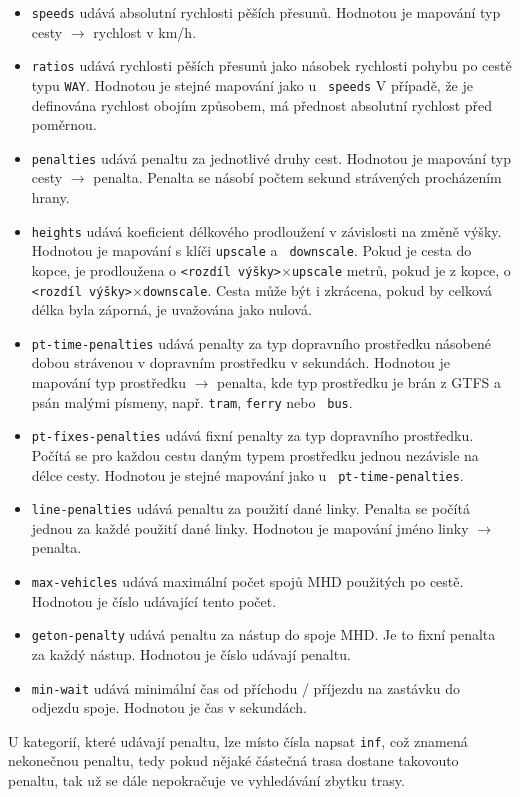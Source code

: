 \begin{itemize}
	\item {\tt speeds} udává absolutní rychlosti pěších přesunů. Hodnotou je mapování
	typ cesty $\rightarrow$ rychlost v km/h.
	\item {\tt ratios} udává rychlosti pěších přesunů jako násobek rychlosti
	pohybu po cestě typu {\tt WAY}. Hodnotou je stejné mapování jako u {\tt
	speeds} V případě, že je definována rychlost obojím způsobem, má
	přednost absolutní rychlost před poměrnou.
	\item {\tt penalties} udává penaltu za jednotlivé druhy cest. Hodnotou
	je mapování typ cesty $\rightarrow$ penalta. Penalta se násobí počtem
	sekund strávených procházením hrany. 
	\item {\tt heights} udává koeficient délkového prodloužení v závislosti
	na změně výšky. Hodnotou je mapování s klíči {\tt upscale} a {\tt
	downscale}.  Pokud je cesta do kopce, je prodloužena o {\tt <rozdíl
	výšky>}$\times${\tt upscale} metrů, pokud je z kopce, o {\tt <rozdíl
	výšky>}$\times${\tt downscale}. Cesta může být i zkrácena, pokud by
	celková délka byla záporná, je uvažována jako nulová.
	\item {\tt pt-time-penalties} udává penalty za typ dopravního prostředku
	násobené dobou strávenou v dopravním prostředku v sekundách. Hodnotou je
	mapování typ prostředku $\rightarrow$ penalta, kde typ prostředku je brán
	z GTFS a psán malými písmeny, např. {\tt tram}, {\tt ferry} nebo {\tt
	bus}.
	\item {\tt pt-fixes-penalties} udává fixní penalty za typ dopravního
	prostředku. Počítá se pro každou cestu daným typem prostředku jednou
	nezávisle na délce cesty. Hodnotou je stejné mapování jako u {\tt
	pt-time-penalties}.
	\item {\tt line-penalties} udává penaltu za použití dané linky. Penalta
	se počítá jednou za každé použití dané linky. Hodnotou je mapování jméno
	linky $\rightarrow$ penalta. 
	\item {\tt max-vehicles} udává maximální počet spojů MHD použitých po
	cestě. Hodnotou je číslo udávající tento počet.
	\item {\tt geton-penalty} udává penaltu za nástup do spoje MHD. Je to
	fixní penalta za každý nástup. Hodnotou je číslo udávají penaltu.
	\item {\tt min-wait} udává minimální čas od příchodu /
	příjezdu na zastávku do odjezdu spoje. Hodnotou je čas v sekundách.
\end{itemize}
U kategorií, které udávají penaltu, lze místo čísla napsat {\tt inf}, což znamená
nekonečnou penaltu, tedy pokud nějaké částečná trasa dostane takovouto penaltu,
tak už se dále nepokračuje ve vyhledávání zbytku trasy.


